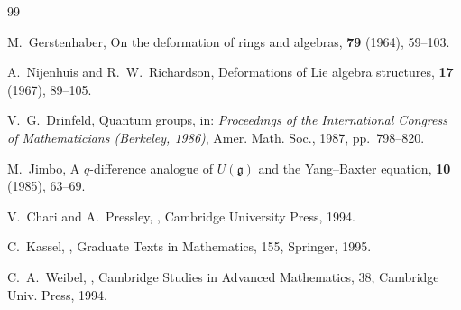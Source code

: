 \documentclass[11pt,a4paper]{article}
\numberwithin{equation}{section}
\begin{document}
	\begin{thebibliography}{99}
		
		M.~Gerstenhaber,
		\newblock On the deformation of rings and algebras,
		 \textbf{79} (1964), 59--103.
		
		A.~Nijenhuis and R.~W.~Richardson,
		\newblock Deformations of Lie algebra structures,
		 \textbf{17} (1967), 89--105.
		
		V.~G.~Drinfeld,
		\newblock Quantum groups,
		\newblock in: {\em Proceedings of the International Congress of Mathematicians (Berkeley, 1986)}, 
		\newblock Amer. Math. Soc., 1987, pp.~798--820.
		
		M.~Jimbo,
		\newblock A $q$-difference analogue of $U(\mathfrak{g})$ and the Yang--Baxter equation,
		 \textbf{10} (1985), 63--69.
		
		V.~Chari and A.~Pressley,
		,
		\newblock Cambridge University Press, 1994.
		
		C.~Kassel,
		,
		\newblock Graduate Texts in Mathematics, 155, Springer, 1995.
		
		C.~A.~Weibel,
		,
		\newblock Cambridge Studies in Advanced Mathematics, 38, Cambridge Univ. Press, 1994.
		
	\end{thebibliography}
	
\end{document}
